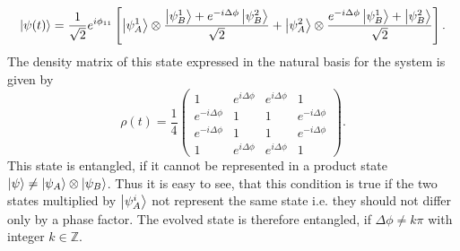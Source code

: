 \begin{equation}
  \ket{\psi(t)} = \frac{1}{\sqrt{2}}e^{i\phi_{11}}\left[ 
    \ket{\psi_A^1} \otimes \frac{\ket{\psi_B^1} + e^{-i\Delta\phi} \ket{\psi_B^2}}{\sqrt{2}}
    + \ket{\psi_A^2} \otimes \frac{e^{-i\Delta\phi} \ket{\psi_B^1} + \ket{\psi_B^2}}{\sqrt{2}} \right] .
\end{equation}
The density matrix of this state expressed in the natural basis for the system is given by
\begin{equation}
  \rho(t) = \frac{1}{4}
  \begin{pmatrix}
    1 & e^{i\Delta\phi}  & e^{i\Delta\phi} & 1 \\
    e^{-i\Delta\phi} & 1 & 1  & e^{-i\Delta\phi} \\
    e^{-i\Delta\phi} & 1  & 1 & e^{-i\Delta\phi} \\
    1 & e^{i\Delta\phi} & e^{i\Delta\phi} & 1
  \end{pmatrix}.
\end{equation}
This state is entangled, if it cannot be represented in a product state $\ket{\psi} \neq \ket{\psi_A}\otimes\ket{\psi_B}$. Thus it is easy to see, that this condition is true if the two states multiplied by $\ket{\psi_A^i}$ not represent the same state i.e. they should not differ only by a phase factor.
The evolved state is therefore entangled, if $\Delta \phi \neq k\pi$ with integer $k \in \mathbb{Z}$.




